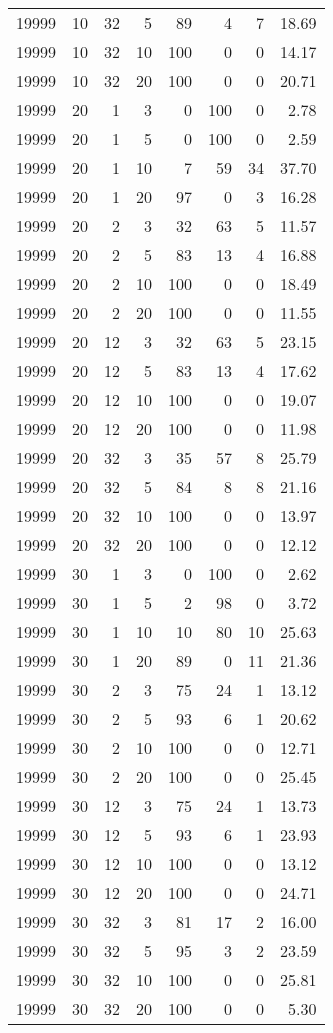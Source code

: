 \begin{tabular}{rrrrrrrr}
19999 & 10 & 32 & 5 & 89 & 4 & 7 & 18.69 \\
19999 & 10 & 32 & 10 & 100 & 0 & 0 & 14.17 \\
19999 & 10 & 32 & 20 & 100 & 0 & 0 & 20.71 \\
19999 & 20 & 1 & 3 & 0 & 100 & 0 & 2.78 \\
19999 & 20 & 1 & 5 & 0 & 100 & 0 & 2.59 \\
19999 & 20 & 1 & 10 & 7 & 59 & 34 & 37.70 \\
19999 & 20 & 1 & 20 & 97 & 0 & 3 & 16.28 \\
19999 & 20 & 2 & 3 & 32 & 63 & 5 & 11.57 \\
19999 & 20 & 2 & 5 & 83 & 13 & 4 & 16.88 \\
19999 & 20 & 2 & 10 & 100 & 0 & 0 & 18.49 \\
19999 & 20 & 2 & 20 & 100 & 0 & 0 & 11.55 \\
19999 & 20 & 12 & 3 & 32 & 63 & 5 & 23.15 \\
19999 & 20 & 12 & 5 & 83 & 13 & 4 & 17.62 \\
19999 & 20 & 12 & 10 & 100 & 0 & 0 & 19.07 \\
19999 & 20 & 12 & 20 & 100 & 0 & 0 & 11.98 \\
19999 & 20 & 32 & 3 & 35 & 57 & 8 & 25.79 \\
19999 & 20 & 32 & 5 & 84 & 8 & 8 & 21.16 \\
19999 & 20 & 32 & 10 & 100 & 0 & 0 & 13.97 \\
19999 & 20 & 32 & 20 & 100 & 0 & 0 & 12.12 \\
19999 & 30 & 1 & 3 & 0 & 100 & 0 & 2.62 \\
19999 & 30 & 1 & 5 & 2 & 98 & 0 & 3.72 \\
19999 & 30 & 1 & 10 & 10 & 80 & 10 & 25.63 \\
19999 & 30 & 1 & 20 & 89 & 0 & 11 & 21.36 \\
19999 & 30 & 2 & 3 & 75 & 24 & 1 & 13.12 \\
19999 & 30 & 2 & 5 & 93 & 6 & 1 & 20.62 \\
19999 & 30 & 2 & 10 & 100 & 0 & 0 & 12.71 \\
19999 & 30 & 2 & 20 & 100 & 0 & 0 & 25.45 \\
19999 & 30 & 12 & 3 & 75 & 24 & 1 & 13.73 \\
19999 & 30 & 12 & 5 & 93 & 6 & 1 & 23.93 \\
19999 & 30 & 12 & 10 & 100 & 0 & 0 & 13.12 \\
19999 & 30 & 12 & 20 & 100 & 0 & 0 & 24.71 \\
19999 & 30 & 32 & 3 & 81 & 17 & 2 & 16.00 \\
19999 & 30 & 32 & 5 & 95 & 3 & 2 & 23.59 \\
19999 & 30 & 32 & 10 & 100 & 0 & 0 & 25.81 \\
19999 & 30 & 32 & 20 & 100 & 0 & 0 & 5.30 \\
\bottomrule
\end{tabular}
